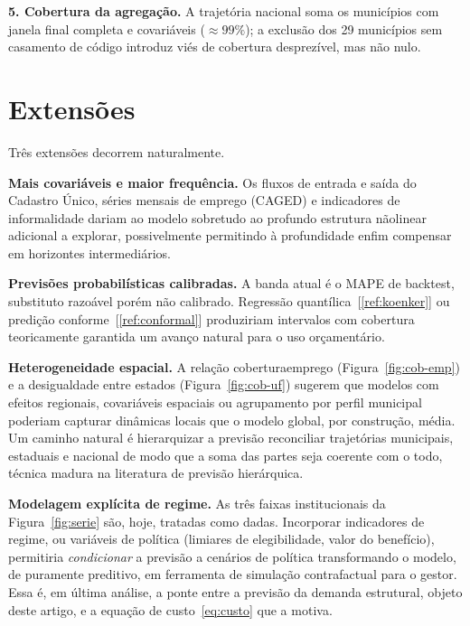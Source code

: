 \documentclass[12pt,a4paper,oneside]{article}
\newcommand{\C}[1]{[\ref{#1}]}
\begin{document}
\textbf{5. Cobertura da agregação.} A trajetória nacional soma os
municípios com janela final completa e covariáveis ($\approx 99\%$); a
exclusão dos 29 municípios sem casamento de código introduz viés de
cobertura desprezível, mas não nulo.

\section{Extensões}
\label{sec:extensoes}

Três extensões decorrem naturalmente.

\textbf{Mais covariáveis e maior frequência.} Os fluxos de entrada e saída
do Cadastro Único, séries mensais de emprego (CAGED) e indicadores de
informalidade dariam ao modelo \textemdash{} sobretudo ao profundo
\textemdash{} estrutura não\-linear adicional a explorar, possivelmente
permitindo à profundidade enfim compensar em horizontes intermediários.

\textbf{Previsões probabilísticas calibradas.} A banda atual é o MAPE de
backtest, substituto razoável porém não calibrado. Regressão
quantílica~\C{ref:koenker} ou predição conforme~\C{ref:conformal}
produziriam intervalos com cobertura teoricamente garantida \textemdash{}
um avanço natural para o uso orçamentário.

\textbf{Heterogeneidade espacial.} A relação cobertura\textendash emprego
(Figura~\ref{fig:cob-emp}) e a desigualdade entre estados
(Figura~\ref{fig:cob-uf}) sugerem que modelos com efeitos regionais,
covariáveis espaciais ou agrupamento por perfil municipal poderiam capturar
dinâmicas locais que o modelo global, por construção, média. Um caminho
natural é hierarquizar a previsão \textemdash{} reconciliar trajetórias
municipais, estaduais e nacional \textemdash{} de modo que a soma das
partes seja coerente com o todo, técnica madura na literatura de previsão
hierárquica.

\textbf{Modelagem explícita de regime.} As três faixas institucionais da
Figura~\ref{fig:serie} são, hoje, tratadas como dadas. Incorporar
indicadores de regime, ou variáveis de política (limiares de elegibilidade,
valor do benefício), permitiria \emph{condicionar} a previsão a cenários de
política \textemdash{} transformando o modelo, de puramente preditivo, em
ferramenta de simulação contrafactual para o gestor. Essa é, em última
análise, a ponte entre a previsão da demanda estrutural, objeto deste
artigo, e a equação de custo~\eqref{eq:custo} que a motiva.
\end{document}
